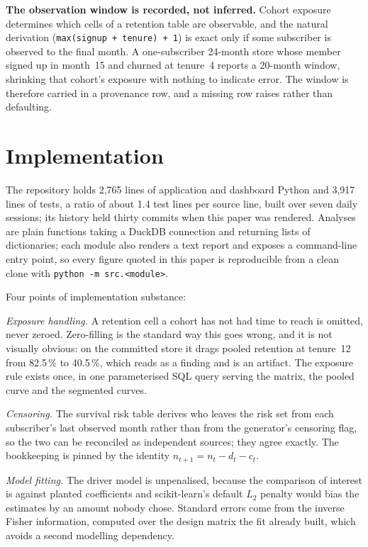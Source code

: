 \documentclass[conference]{IEEEtran}
\begin{document}
\textbf{The observation window is recorded, not inferred.} Cohort exposure
determines which cells of a retention table are observable, and the natural
derivation (\texttt{max(signup + tenure) + 1}) is exact only if some subscriber
is observed to the final month. A one-subscriber 24-month store whose member
signed up in month~15 and churned at tenure~4 reports a 20-month window,
shrinking that cohort's exposure with nothing to indicate error. The window is
therefore carried in a provenance row, and a missing row raises rather than
defaulting.

\section{Implementation}

The repository holds 2{,}765 lines of application and dashboard Python and
3{,}917 lines of tests, a ratio of about 1.4 test lines per source line, built
over seven daily sessions; its history held thirty commits when this paper was
rendered. Analyses are plain functions
taking a DuckDB connection and returning lists of dictionaries; each module
also renders a text report and exposes a command-line entry point, so every
figure quoted in this paper is reproducible from a clean clone with
\texttt{python -m src.<module>}.

Four points of implementation substance:

\emph{Exposure handling.} A retention cell a cohort has not had time to reach
is omitted, never zeroed. Zero-filling is the standard way this goes wrong, and
it is not visually obvious: on the committed store it drags pooled retention at
tenure~12 from 82.5\,\% to 40.5\,\%, which reads as a finding and is an
artifact. The exposure rule exists once, in one parameterised SQL query serving
the matrix, the pooled curve and the segmented curves.

\emph{Censoring.} The survival risk table derives who leaves the risk set from
each subscriber's last observed month rather than from the generator's
censoring flag, so the two can be reconciled as independent sources; they agree
exactly. The bookkeeping is pinned by the identity $n_{t+1} = n_t - d_t - c_t$.

\emph{Model fitting.} The driver model is unpenalised, because the comparison of
interest is against planted coefficients and scikit-learn's default $L_2$
penalty would bias the estimates by an amount nobody chose. Standard errors come
from the inverse Fisher information, computed over the design matrix the fit
already built, which avoids a second modelling dependency.
\end{document}
